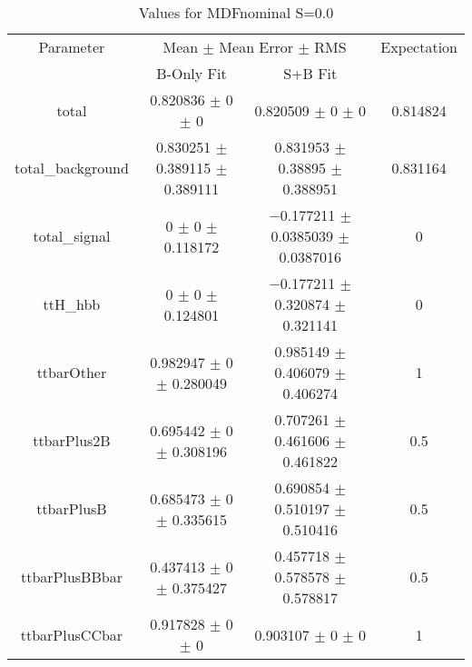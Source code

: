 \begin{table}
\centering
\caption{Values for MDFnominal S=0.0}
\begin{tabular}{cccc}
\toprule
Parameter & \multicolumn{2}{c}{Mean $\pm$ Mean Error $\pm$ RMS} & Expectation\\
 & B-Only Fit & S+B Fit & \\
\midrule
total & \num{0.820836} $\pm$ \num{0} $\pm$ \num{0} & \num{0.820509} $\pm$ \num{0} $\pm$ \num{0} & \num{0.814824}\\
total\_background & \num{0.830251} $\pm$ \num{0.389115} $\pm$ \num{0.389111} & \num{0.831953} $\pm$ \num{0.38895} $\pm$ \num{0.388951} & \num{0.831164}\\
total\_signal & \num{0} $\pm$ \num{0} $\pm$ \num{0.118172} & \num{-0.177211} $\pm$ \num{0.0385039} $\pm$ \num{0.0387016} & \num{0}\\
ttH\_hbb & \num{0} $\pm$ \num{0} $\pm$ \num{0.124801} & \num{-0.177211} $\pm$ \num{0.320874} $\pm$ \num{0.321141} & \num{0}\\
ttbarOther & \num{0.982947} $\pm$ \num{0} $\pm$ \num{0.280049} & \num{0.985149} $\pm$ \num{0.406079} $\pm$ \num{0.406274} & \num{1}\\
ttbarPlus2B & \num{0.695442} $\pm$ \num{0} $\pm$ \num{0.308196} & \num{0.707261} $\pm$ \num{0.461606} $\pm$ \num{0.461822} & \num{0.5}\\
ttbarPlusB & \num{0.685473} $\pm$ \num{0} $\pm$ \num{0.335615} & \num{0.690854} $\pm$ \num{0.510197} $\pm$ \num{0.510416} & \num{0.5}\\
ttbarPlusBBbar & \num{0.437413} $\pm$ \num{0} $\pm$ \num{0.375427} & \num{0.457718} $\pm$ \num{0.578578} $\pm$ \num{0.578817} & \num{0.5}\\
ttbarPlusCCbar & \num{0.917828} $\pm$ \num{0} $\pm$ \num{0} & \num{0.903107} $\pm$ \num{0} $\pm$ \num{0} & \num{1}\\
\bottomrule
\end{tabular}
\end{table}